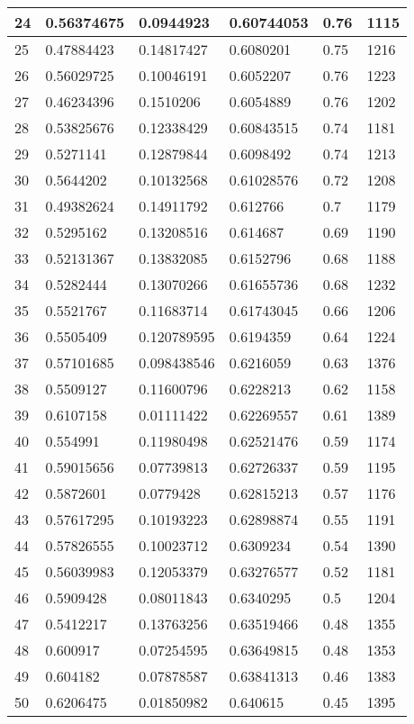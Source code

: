 \begin{longtable}{|l|l|l|l|l|l|}
24 & 0.56374675 & 0.0944923 & 0.60744053 & 0.76 & 1115 \\ \hline 
25 & 0.47884423 & 0.14817427 & 0.6080201 & 0.75 & 1216 \\ \hline 
26 & 0.56029725 & 0.10046191 & 0.6052207 & 0.76 & 1223 \\ \hline 
27 & 0.46234396 & 0.1510206 & 0.6054889 & 0.76 & 1202 \\ \hline 
28 & 0.53825676 & 0.12338429 & 0.60843515 & 0.74 & 1181 \\ \hline 
29 & 0.5271141 & 0.12879844 & 0.6098492 & 0.74 & 1213 \\ \hline 
30 & 0.5644202 & 0.10132568 & 0.61028576 & 0.72 & 1208 \\ \hline 
31 & 0.49382624 & 0.14911792 & 0.612766 & 0.7 & 1179 \\ \hline 
32 & 0.5295162 & 0.13208516 & 0.614687 & 0.69 & 1190 \\ \hline 
33 & 0.52131367 & 0.13832085 & 0.6152796 & 0.68 & 1188 \\ \hline 
34 & 0.5282444 & 0.13070266 & 0.61655736 & 0.68 & 1232 \\ \hline 
35 & 0.5521767 & 0.11683714 & 0.61743045 & 0.66 & 1206 \\ \hline 
36 & 0.5505409 & 0.120789595 & 0.6194359 & 0.64 & 1224 \\ \hline 
37 & 0.57101685 & 0.098438546 & 0.6216059 & 0.63 & 1376 \\ \hline 
38 & 0.5509127 & 0.11600796 & 0.6228213 & 0.62 & 1158 \\ \hline 
39 & 0.6107158 & 0.01111422 & 0.62269557 & 0.61 & 1389 \\ \hline 
40 & 0.554991 & 0.11980498 & 0.62521476 & 0.59 & 1174 \\ \hline 
41 & 0.59015656 & 0.07739813 & 0.62726337 & 0.59 & 1195 \\ \hline 
42 & 0.5872601 & 0.0779428 & 0.62815213 & 0.57 & 1176 \\ \hline 
43 & 0.57617295 & 0.10193223 & 0.62898874 & 0.55 & 1191 \\ \hline 
44 & 0.57826555 & 0.10023712 & 0.6309234 & 0.54 & 1390 \\ \hline 
45 & 0.56039983 & 0.12053379 & 0.63276577 & 0.52 & 1181 \\ \hline 
46 & 0.5909428 & 0.08011843 & 0.6340295 & 0.5 & 1204 \\ \hline 
47 & 0.5412217 & 0.13763256 & 0.63519466 & 0.48 & 1355 \\ \hline 
48 & 0.600917 & 0.07254595 & 0.63649815 & 0.48 & 1353 \\ \hline 
49 & 0.604182 & 0.07878587 & 0.63841313 & 0.46 & 1383 \\ \hline 
50 & 0.6206475 & 0.01850982 & 0.640615 & 0.45 & 1395 \\ \hline 
\end{longtable}